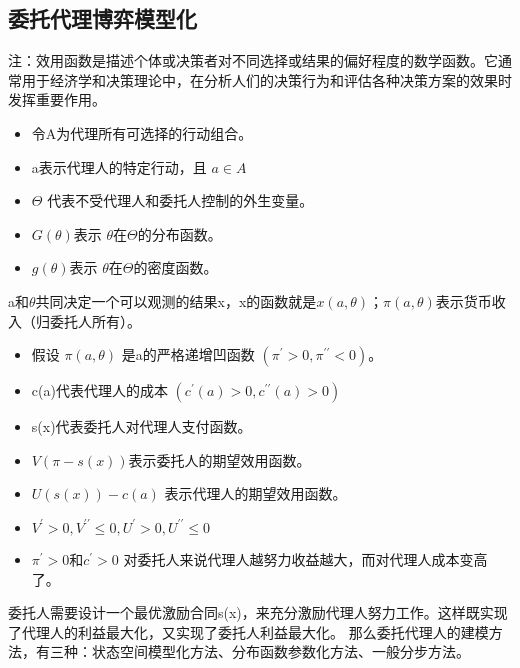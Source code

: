 \documentclass[12pt, a4paper]{article} %
\begin{document}
\begin{CJK*}{UTF8}{gbsn}
        \subsection{委托代理博弈模型化}
        注：效用函数是描述个体或决策者对不同选择或结果的偏好程度的数学函数。它通常用于经济学和决策理论中，在分析人们的决策行为和评估各种决策方案的效果时发挥重要作用。
            \begin{itemize}
                \item 令A为代理所有可选择的行动组合。
                \item a表示代理人的特定行动，且 $ a \in A$
                \item $\Theta$ 代表不受代理人和委托人控制的外生变量。
                \item $G(\theta)$表示 $\theta$在$\Theta$的分布函数。
                \item $g(\theta)$表示 $\theta$在$\Theta$的密度函数。
            \end{itemize}
            a和$\theta$共同决定一个可以观测的结果x，x的函数就是$x(a,\theta)$；$\pi(a,\theta)$表示货币收入（归委托人所有）。
            \begin{itemize}
                \item[] 假设 $\pi(a,\theta)$ 是a的严格递增凹函数 $(\pi^{\prime}>0, \pi^{\prime\prime}<0)$。
                \item[] c(a)代表代理人的成本 $(c^{\prime}(a)>0,c^{\prime\prime}(a)>0)$
                \item[] s(x)代表委托人对代理人支付函数。
                \item[] $V(\pi-s(x))$表示委托人的期望效用函数。
                \item[] $U(s(x))-c(a)$ 表示代理人的期望效用函数。
                \item[] $V^{\prime}>0, V^{\prime\prime} \leq 0, U^{\prime}>0, U^{\prime\prime} \leq 0$
                \item[] $\pi^{\prime} > 0$和$c^{\prime} > 0$ 对委托人来说代理人越努力收益越大，而对代理人成本变高了。
            \end{itemize}

            委托人需要设计一个最优激励合同s(x)，来充分激励代理人努力工作。这样既实现了代理人的利益最大化，又实现了委托人利益最大化。
            那么委托代理人的建模方法，有三种：状态空间模型化方法、分布函数参数化方法、一般分步方法。


\end{CJK*}
\end{document}

